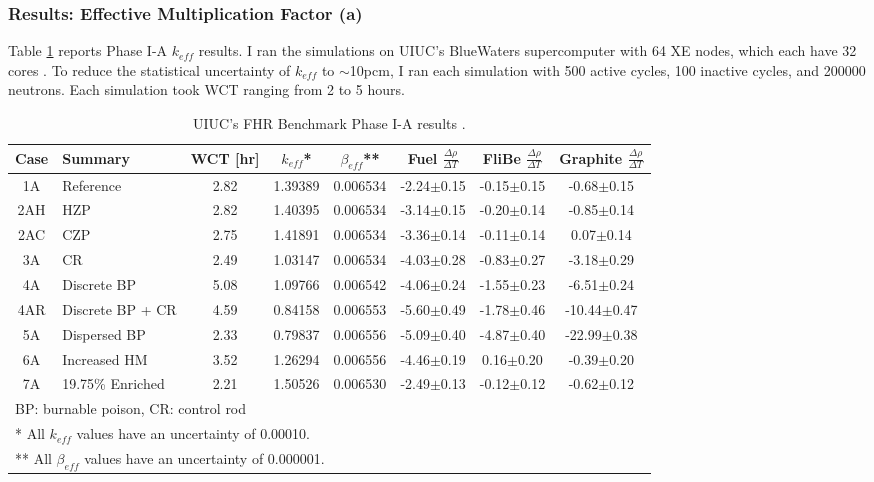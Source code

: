 \subsubsection{Results: Effective Multiplication Factor (a)}
\label{sec:fhr-benchmark-keff}
Table \ref{tab:phase1a-results} reports Phase I-A $k_{eff}$ results. 
I ran the simulations on \gls{UIUC}'s BlueWaters supercomputer with 64 XE nodes, 
which each have 32 cores \cite{ncsa_about_2017}. 
To reduce the statistical uncertainty of $k_{eff}$ to $\sim$10pcm, I ran each 
simulation with 500 active cycles, 100 inactive cycles, and 200000 neutrons. 
Each simulation took \gls{WCT} ranging from 2 to 5 hours. 
\begin{table}[htbp]
    \centering
    \onehalfspacing
    \caption{\acrlong{UIUC}'s \acrlong{FHR} Benchmark Phase I-A results 
    \cite{chee_arfcfhr-benchmark_2021}.}
	\label{tab:phase1a-results}
    \footnotesize
    \begin{tabular}{cp{2.7cm}cccccc}
    \hline
    \textbf{Case} & \textbf{Summary} & \textbf{WCT [hr]} & \textbf{$k_{eff}$}* & 
    \textbf{$\beta_{eff}$}** & 
    \textbf{Fuel} $\frac{\Delta \rho}{\Delta T}$ & 
    \textbf{FliBe} $\frac{\Delta \rho}{\Delta T}$ & 
    \textbf{Graphite} $\frac{\Delta \rho}{\Delta T}$\\
    \hline 
    1A & Reference &2.82&1.39389 & 0.006534 & -2.24$\pm$0.15 & -0.15$\pm$0.15 & -0.68$\pm$0.15\\
    2AH & \gls{HZP} &2.82&1.40395 & 0.006534 & -3.14$\pm$0.15 & -0.20$\pm$0.14 & -0.85$\pm$0.14\\
    2AC & \gls{CZP} &2.75&1.41891 & 0.006534 & -3.36$\pm$0.14 & -0.11$\pm$0.14 & 0.07$\pm$0.14\\
    3A & CR &2.49&1.03147 & 0.006534 & -4.03$\pm$0.28 & -0.83$\pm$0.27 & -3.18$\pm$0.29\\
    4A & Discrete BP &5.08&1.09766 & 0.006542 & -4.06$\pm$0.24 & -1.55$\pm$0.23 & -6.51$\pm$0.24\\
    4AR & Discrete BP + CR &4.59&0.84158 & 0.006553 & -5.60$\pm$0.49 & -1.78$\pm$0.46 & -10.44$\pm$0.47\\
    5A & Dispersed BP &2.33&0.79837 & 0.006556 & -5.09$\pm$0.40 & -4.87$\pm$0.40 & -22.99$\pm$0.38\\
    6A & Increased \gls{HM} &3.52&1.26294 & 0.006556 & -4.46$\pm$0.19 & 0.16$\pm$0.20 & -0.39$\pm$0.20\\
    7A & 19.75\% Enriched &2.21&1.50526 & 0.006530 & -2.49$\pm$0.13 & -0.12$\pm$0.12 & -0.62$\pm$0.12\\
    \hline
    \multicolumn{5}{l}{BP: burnable poison, CR: control rod} \\
    \multicolumn{5}{l}{* All $k_{eff}$ values have an uncertainty of 0.00010.} \\
    \multicolumn{5}{l}{** All $\beta_{eff}$ values have an uncertainty of 0.000001.}
    \end{tabular}
\end{table}

